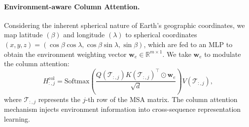 



\paragraph{Environment-aware Column Attention.} Considering the inherent spherical nature of Earth's geographic coordinates, we map latitude $(\beta)$ and longitude $(\lambda)$ to spherical coordinates $(x,y,z)=(\cos\beta \cos\lambda, \cos\beta  \sin\lambda, \sin\beta )$, which are fed to an MLP to obtain the environment weighting vector $\boldsymbol{w}_e \in \mathbb{R}^{m \times 1} $. We take $\boldsymbol{w}_e$ to modulate the column attention:
\begin{equation}
    H^{\text{col}}_{:,j} = \text{Softmax} \left( \frac{Q(\mathcal{T}_{:,j}) K(\mathcal{T}_{:,j})^\top \odot \boldsymbol{w}_e}{\sqrt{d}} \right) V(\mathcal{T}_{:,j}),
\end{equation}
where \(\mathcal{T}_{:,j}\) represents the \(j\)-th row of the MSA matrix. The column attention mechanism injects environment information into cross-sequence representation learning. 





